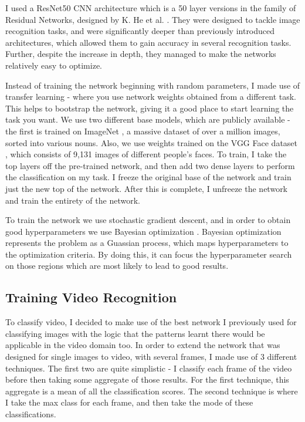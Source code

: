 \documentclass[sigconf]{acmart}
\begin{document}
{I used a ResNet50 CNN architecture which is a 50 layer versions in the 
family of Residual Networks, designed by K.
He et al. \cite{DBLP:journals/corr/HeZRS15}. They were designed to tackle
image recognition tasks, and were significantly deeper than previously
introduced architectures, which allowed them to gain accuracy in several
recognition tasks. 
Further, despite the increase in depth, they managed to make
the networks relatively easy to optimize.

Instead of training the network beginning with random parameters, I made use
of transfer learning - where you use network weights obtained from a different
task. This helps to bootstrap the network, giving it a good place to start
learning the task you want.  
We use two different base models, which are publicly available - the first is
trained on ImageNet \cite{ILSVRC15}, a massive dataset of over a million
images, sorted into various nouns. Also, we use weights trained on the VGG
Face dataset \cite{parkhi2015deep}, which consists of 9,131 images of
different people's faces.
To train, I take the top layers off the pre-trained network, and then add two
dense layers to perform the classification on my task. I freeze the original
base of the network and train just the new top of the network. After this is
complete, I unfreeze the network and train the entirety of the network.

To train the network we use stochastic gradient descent, and in order to
obtain good hyperparameters  we use Bayesian optimization \cite{snoek2012practical}. Bayesian
optimization represents the problem as a Guassian process, which maps
hyperparameters to the optimization criteria. By doing this, it can focus the
hyperparameter search on those regions which are most likely to lead to good
results.

\subsection{Training Video Recognition}

To classify video, I decided to make use of the best network I previously used
for classifying images with the logic that the patterns learnt there would be
applicable in the video domain too. In order to extend the network that was
designed for single images to video, with several frames, I made use of 3
different techniques. The first two are quite simplistic - I classify each
frame of the video before then taking some aggregate of those results. For the
first technique, this aggregate is a mean of all the classification scores.
The second technique is where I take the max class for each frame, and then
take the mode of these classifications.

}
\end{document}
